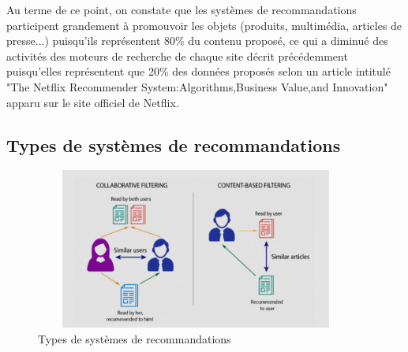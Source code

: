 Au terme de ce point, on constate que les systèmes de recommandations participent grandement à promouvoir les objets (produits, multimédia, articles de presse...) puisqu'ils représentent 80\% du contenu proposé, ce qui a diminué des activités des moteurs de recherche de chaque site décrit précédemment puisqu'elles représentent que 20\% des données proposés selon un article intitulé "The Netflix Recommender System:Algorithms,Business Value,and Innovation" apparu sur le site officiel de Netflix.\\

\subsection{Types de systèmes de recommandations}
\begin{figure}[H]
        \centering
            \includegraphics[height=150pt,width=300pt]{img/chapter1/filtering.png}
        \caption{Types de systèmes de recommandations\cite{figfiltering}}

\end{figure}


